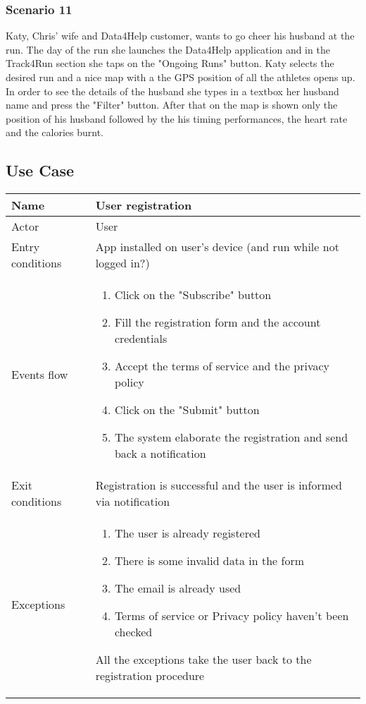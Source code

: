 \subsubsection{Scenario 11}
Katy, Chris' wife and Data4Help customer,  wants to go cheer his husband at the run. The day of the run she launches the Data4Help application and in the Track4Run section she taps on the "Ongoing Runs" button. Katy selects the desired run and a nice map with a the GPS position of all the athletes opens up. In order to see the details of the husband she types in a textbox her husband name and press the "Filter" button. After that on the map is shown only the position of his husband followed by the his timing performances, the heart rate and the calories burnt. 
\subsection{Use Case}
\begin{table}[]
\begin{tabular}{|l|p{12cm}|}
\hline
Name             & User registration \\ \hline
Actor            & User \\ \hline
Entry conditions & App installed on user's device (and run while not logged in?) \\ \hline
Events flow      & \begin{enumerate}
\item Click on the "Subscribe" button
\item Fill the registration form and the account credentials
\item Accept the terms of service and the privacy policy
\item Click on the "Submit" button
\item The system elaborate the registration and send back a notification
\end{enumerate} 
\\ \hline
Exit conditions  & Registration is successful and the user is informed via notification \\ \hline
Exceptions       & \begin{enumerate}
\item The user is already registered
\item There is some invalid data in the form
\item The email is already used
\item Terms of service or Privacy policy haven't been checked
\end{enumerate} All the exceptions take the user back to the registration procedure \\ \hline
\end{tabular}
\end{table}


